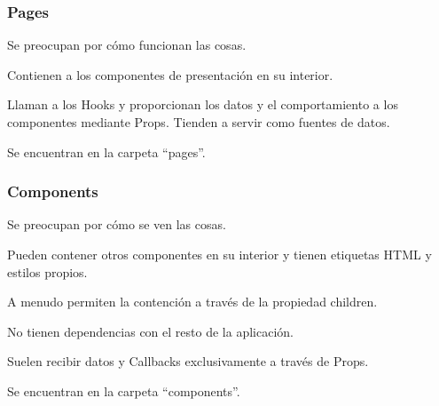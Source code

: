 \documentclass[12pt,twoside,titlepage]{report}
\begin{document}
\subsubsection{Pages}

\begin{compactitem}
    \item Se preocupan por cómo funcionan las cosas.
    \item Contienen a los componentes de presentación en su interior.
    \item Llaman a los Hooks y proporcionan los datos y el comportamiento a los componentes mediante Props. Tienden a servir como fuentes de datos.
    \item Se encuentran en la carpeta ``pages''. %
\end{compactitem}

\subsubsection{Components}

\begin{compactitem}
    \item Se preocupan por cómo se ven las cosas.
    \item Pueden contener otros componentes en su interior y tienen etiquetas HTML y estilos propios.
    \item A menudo permiten la contención a través de la propiedad children.
    \item No tienen dependencias con el resto de la aplicación.
    \item Suelen recibir datos y Callbacks exclusivamente a través de Props.
    \item Se encuentran en la carpeta ``components''. %
\end{compactitem}

\end{document}
